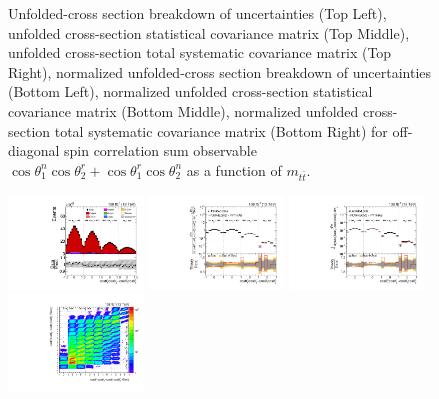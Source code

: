 \begin{figure}[htb]
\begin{center}
\caption{Unfolded-cross section breakdown of uncertainties (Top Left), unfolded cross-section statistical covariance matrix (Top Middle), unfolded cross-section total systematic covariance matrix (Top Right), normalized unfolded-cross section breakdown of uncertainties (Bottom Left), normalized unfolded cross-section statistical covariance matrix (Bottom Middle), normalized unfolded cross-section total systematic covariance matrix (Bottom Right) for off-diagonal spin correlation sum observable $\cos\theta_{1}^{n}\cos\theta_{2}^{r}+\cos\theta_{1}^{r}\cos\theta_{2}^{n}$ as a function of $m_{t\bar{t}}$.}
\label{fig:c_Pnr_mttbar_uncertainties}
\end{center}
\end{figure}
\clearpage
\begin{figure}[htb]
\begin{center}
 \includegraphics[width=0.32\textwidth]{fig_fullRun2UL/controlplots/combined/Hyp_LLBarCMnr_vs_TTBarMass.pdf}
 \includegraphics[width=0.32\textwidth]{fig_fullRun2UL/unfolding/combined/UnfoldedResults_c_Mnr_mttbar.pdf}
 \includegraphics[width=0.32\textwidth]{fig_fullRun2UL/unfolding/combined/UnfoldedResultsNorm_c_Mnr_mttbar.pdf} \\
 \includegraphics[width=0.32\textwidth]{fig_fullRun2UL/unfolding/combined/ResponseMatrix_c_Mnr_mttbar.pdf}

\end{center}
\end{figure}
